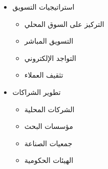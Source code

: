 \begin{itemize}
\begin{itemize}
        \item استراتيجيات التسويق
        \begin{itemize}
            \item التركيز على السوق المحلي
            \item التسويق المباشر
            \item التواجد الإلكتروني
            \item تثقيف العملاء
        \end{itemize}
        
        \item تطوير الشراكات
        \begin{itemize}
            \item الشركات المحلية
            \item مؤسسات البحث
            \item جمعيات الصناعة
            \item الهيئات الحكومية
        \end{itemize}
    \end{itemize}
\end{itemize}


